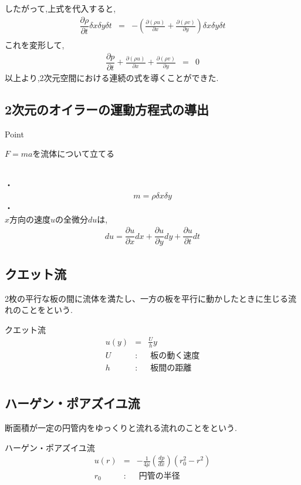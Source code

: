 \documentclass[a4paper]{jsarticle}
\begin{document}
したがって,上式を代入すると,
\begin{eqnarray*}
    \dfrac{\partial \rho}{\partial t}\delta x \delta y \delta t&=&-\left(\frac{\partial\left(\rho u\right)}{\partial x}+\frac{\partial\left(\rho v\right)}{\partial y}\right)\delta x \delta y \delta t\\
\end{eqnarray*}
これを変形して,
\begin{eqnarray*}
    \dfrac{\partial p}{\partial t}+\frac{\partial\left(\rho u\right)}{\partial x}+\frac{\partial\left(\rho v\right)}{\partial y}&=&0
\end{eqnarray*}
以上より,2次元空間における連続の式を導くことができた.
\subsection{2次元のオイラーの運動方程式の導出}
\begin{itembox}[l]{Point}
    \begin{center}
        \quad$F=ma$を流体について立てる
    \end{center}
\end{itembox}
\\
・\\
\begin{eqnarray*}
    m=\rho \delta x \delta y
\end{eqnarray*}
・\\
$x$方向の速度$u$の全微分$du$は,
\begin{eqnarray*}
    du=\dfrac{\partial u}{\partial x}dx+\dfrac{\partial u}{\partial y}dy+\dfrac{\partial u}{\partial t}dt
\end{eqnarray*}
\subsection{クエット流}
2枚の平行な板の間に流体を満たし、一方の板を平行に動かしたときに生じる流れのことをという.
\begin{itembox}[l]{クエット流}
    \begin{eqnarray*}
        u\left(y\right)&=&\frac{U}{h}y\\
        U \;&:&\; 板の動く速度\\
        h \;&:&\; 板間の距離\\
    \end{eqnarray*}
\end{itembox}
\subsection{ハーゲン・ポアズイユ流}
断面積が一定の円管内をゆっくりと流れる流れのことをという.
\begin{itembox}[l]{ハーゲン・ポアズイユ流}
    \begin{eqnarray*}
        u\left(r\right)&=&-\frac{1}{4\mu}\left(\frac{dp}{dx}\right)\left(r_0^2-r^2\right)\\
        r_0\; &:&\; 円管の半径\\
    \end{eqnarray*}
\end{itembox}
\end{document}
